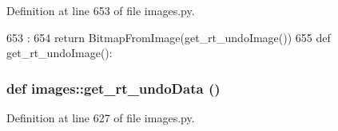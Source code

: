 Definition at line 653 of file images.py.


\begin{DoxyCode}
653                        :
654     return BitmapFromImage(get_rt_undoImage())
655 
def get_rt_undoImage():
\end{DoxyCode}
\hypertarget{namespaceimages_aab6300bcf2d40129d969990f5a6fc304}{
\subsubsection[{get\_\-rt\_\-undoData}]{\setlength{\rightskip}{0pt plus 5cm}def images::get\_\-rt\_\-undoData ()}}
\label{namespaceimages_aab6300bcf2d40129d969990f5a6fc304}


Definition at line 627 of file images.py.


